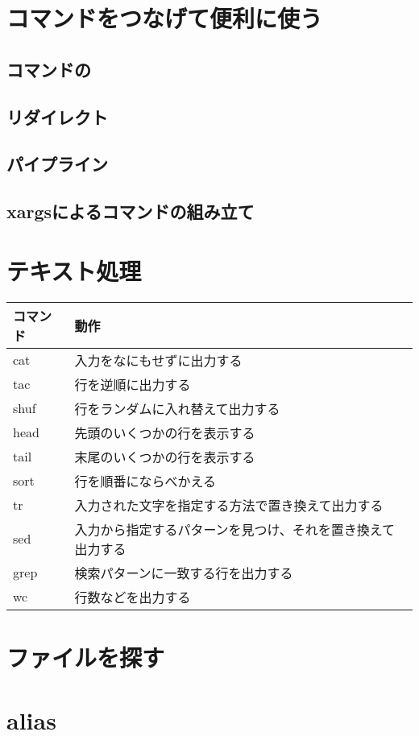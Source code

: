 \section{コマンドをつなげて便利に使う}
\subsection{コマンドの}
\subsection{リダイレクト}
\subsection{パイプライン}

\subsection{xargsによるコマンドの組み立て}
\section{テキスト処理}
\begin{tabular}{ll}
    コマンド & 動作 \\ \hline
    cat & 入力をなにもせずに出力する \\
    tac & 行を逆順に出力する\\
    shuf & 行をランダムに入れ替えて出力する \\
    head & 先頭のいくつかの行を表示する \\
    tail & 末尾のいくつかの行を表示する\\
    sort & 行を順番にならべかえる\\
    tr & 入力された文字を指定する方法で置き換えて出力する \\
    sed & 入力から指定するパターンを見つけ、それを置き換えて出力する \\
    grep & 検索パターンに一致する行を出力する\\
    wc & 行数などを出力する\\ \hline
\end{tabular}

\section{ファイルを探す}
\section{alias}
